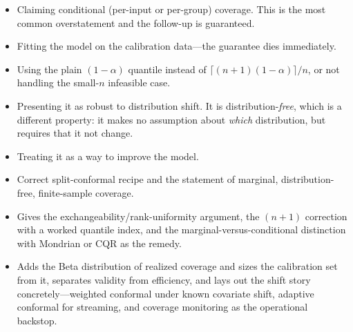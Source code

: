 \begin{interviewq}
\redflags
\begin{itemize}
    \item Claiming conditional (per-input or per-group) coverage. This is the most common overstatement and the follow-up is guaranteed.
    \item Fitting the model on the calibration data---the guarantee dies immediately.
    \item Using the plain $(1-\alpha)$ quantile instead of $\lceil(n+1)(1-\alpha)\rceil/n$, or not handling the small-$n$ infeasible case.
    \item Presenting it as robust to distribution shift. It is distribution-\textit{free}, which is a different property: it makes no assumption about \textit{which} distribution, but requires that it not change.
    \item Treating it as a way to improve the model.
\end{itemize}


\goodgreat
\begin{itemize}
    \item {} Correct split-conformal recipe and the statement of marginal, distribution-free, finite-sample coverage.
    \item {} Gives the exchangeability/rank-uniformity argument, the $(n+1)$ correction with a worked quantile index, and the marginal-versus-conditional distinction with Mondrian or CQR as the remedy.
    \item {} Adds the Beta distribution of realized coverage and sizes the calibration set from it, separates validity from efficiency, and lays out the shift story concretely---weighted conformal under known covariate shift, adaptive conformal for streaming, and coverage monitoring as the operational backstop.
\end{itemize}

\end{interviewq}

